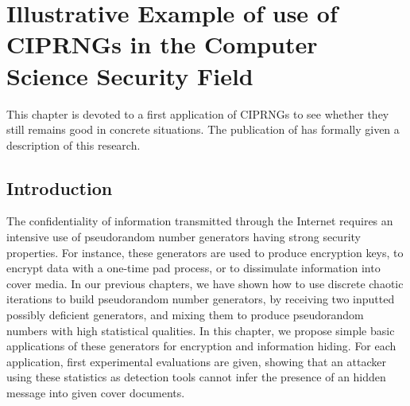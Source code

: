 \chapter{Illustrative Example of use of CIPRNGs in the Computer Science Security Field}
\label{State-of-the-art}

This chapter is devoted to a first application of CIPRNGs to see whether they still remains
good in concrete situations. The publication of \cite{bfg12b:ip} has formally given a description of this research.

\section{Introduction}

The confidentiality of information transmitted through the Internet requires an intensive use of pseudorandom number generators having strong security properties. For instance, these generators are used to produce encryption keys, to encrypt data with a one-time pad process, or to dissimulate information into cover media. In our previous chapters, we have shown how to use  discrete chaotic iterations to build pseudorandom number generators, by receiving two inputted possibly deficient generators, and mixing them to produce pseudorandom numbers with high statistical qualities. In this chapter, 
 we propose simple basic applications of these generators for encryption and information hiding. For each application, first experimental evaluations are given, showing that an attacker using these statistics as detection tools cannot infer the presence of an hidden message into given cover documents.


